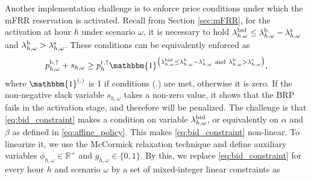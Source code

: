 Another implementation challenge is to enforce price conditions under which the mFRR reservation is activated.
Recall from Section \ref{sec:mFRR}, for the activation at hour $h$ under scenario $\omega$, it is necessary to hold $\lambda_{h,\omega}^{\rm{bid}} \leq  \lambda_{h,\omega}^{\rm{b}} - \lambda_{h,\omega}^{\rm{s}}$ and $ \lambda_{h,\omega}^{\rm{b}} > \lambda_{h,\omega}^{\rm{s}}$. These conditions can be equivalently enforced as
%
%
\begin{equation}\label{eq:bid_constraint}
    p^{\rm{b}, \uparrow}_{h,\omega} + s_{h,\omega} \geq p^{\rm{r},\uparrow}_{h}  \mathbbm{1}^{\big(\lambda_{h,\omega}^{\rm{bid}} \leq  \lambda_{h,\omega}^{\rm{b}} - \lambda_{h,\omega}^{\rm{s}} \ \text{and} \ \lambda^{\rm{b}}_{h,\omega} > \lambda^{\rm{s}}_{h,\omega}\big)},
\end{equation}
where $\mathbbm{1}^{(.)}$ is 1 if conditions (.) are met, otherwise it is zero. If the non-negative slack variable $s_{h,\omega}$ takes a non-zero value, it shows that the BRP fails in the activation stage, and therefore will be penalized. The challenge is that \eqref{eq:bid_constraint} makes a condition on variable $\lambda_{h,\omega}^{\rm{bid}}$, or equivalently on $\alpha$ and $\beta$ as defined in \eqref{eq:affine_policy}. This makes \eqref{eq:bid_constraint} non-linear. To linearize it, we use the McCormick relaxation technique \cite{mccormick1976computability} and define auxiliary  variables $\phi_{h,\omega} \in \mathbb{R}^{+}$ and $g_{h,\omega} \in \{0, 1\}$. By this, we replace \eqref{eq:bid_constraint} for every hour $h$ and scenario $\omega$ by a set of mixed-integer linear constraints as
%
%
